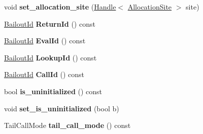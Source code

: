 \begin{DoxyCompactItemize}
\item 
void {\bfseries set\+\_\+allocation\+\_\+site} (\hyperlink{classv8_1_1internal_1_1_handle}{Handle}$<$ \hyperlink{classv8_1_1internal_1_1_allocation_site}{Allocation\+Site} $>$ site)\hypertarget{classv8_1_1internal_1_1_call_a9ec9c88bb36c02c47a85c292168e5533}{}\label{classv8_1_1internal_1_1_call_a9ec9c88bb36c02c47a85c292168e5533}

\item 
\hyperlink{classv8_1_1internal_1_1_bailout_id}{Bailout\+Id} {\bfseries Return\+Id} () const \hypertarget{classv8_1_1internal_1_1_call_a496817a561d4d2159bd9c08daba97319}{}\label{classv8_1_1internal_1_1_call_a496817a561d4d2159bd9c08daba97319}

\item 
\hyperlink{classv8_1_1internal_1_1_bailout_id}{Bailout\+Id} {\bfseries Eval\+Id} () const \hypertarget{classv8_1_1internal_1_1_call_aba887056099f5ef92e6d1d0202e23c82}{}\label{classv8_1_1internal_1_1_call_aba887056099f5ef92e6d1d0202e23c82}

\item 
\hyperlink{classv8_1_1internal_1_1_bailout_id}{Bailout\+Id} {\bfseries Lookup\+Id} () const \hypertarget{classv8_1_1internal_1_1_call_a30e2ecc91c624f8bd47d021984afcc7e}{}\label{classv8_1_1internal_1_1_call_a30e2ecc91c624f8bd47d021984afcc7e}

\item 
\hyperlink{classv8_1_1internal_1_1_bailout_id}{Bailout\+Id} {\bfseries Call\+Id} () const \hypertarget{classv8_1_1internal_1_1_call_a797d9a4c0c4f88619b1ffc42669f0ad1}{}\label{classv8_1_1internal_1_1_call_a797d9a4c0c4f88619b1ffc42669f0ad1}

\item 
bool {\bfseries is\+\_\+uninitialized} () const \hypertarget{classv8_1_1internal_1_1_call_a79e97793a09617cffa408e5051f2f622}{}\label{classv8_1_1internal_1_1_call_a79e97793a09617cffa408e5051f2f622}

\item 
void {\bfseries set\+\_\+is\+\_\+uninitialized} (bool b)\hypertarget{classv8_1_1internal_1_1_call_a06774d6a254fa1f4c696d1bcd94cb24b}{}\label{classv8_1_1internal_1_1_call_a06774d6a254fa1f4c696d1bcd94cb24b}

\item 
Tail\+Call\+Mode {\bfseries tail\+\_\+call\+\_\+mode} () const \hypertarget{classv8_1_1internal_1_1_call_a3aecb5b09ddac5b3b6f7fddfd5924c72}{}\label{classv8_1_1internal_1_1_call_a3aecb5b09ddac5b3b6f7fddfd5924c72}


\end{DoxyCompactItemize}
